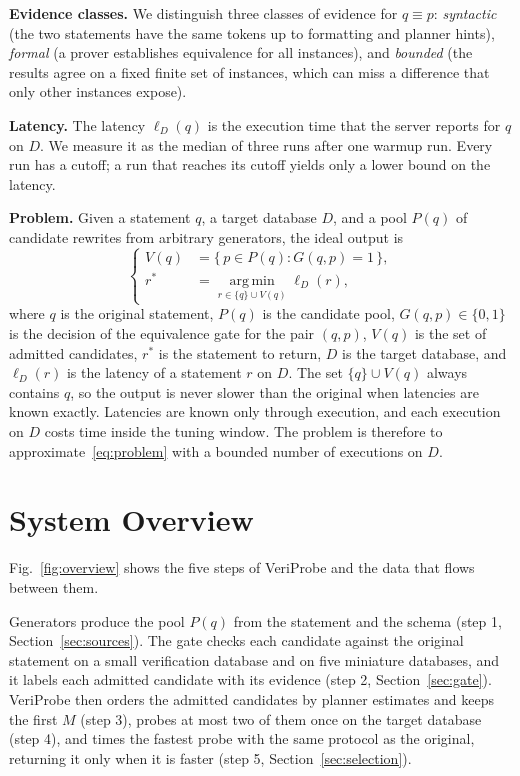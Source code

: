 \documentclass[conference]{IEEEtran}
\newcommand{\sys}{VeriProbe}
\begin{document}
\textbf{Evidence classes.}
We distinguish three classes of evidence for $q \equiv p$: \emph{syntactic} (the two statements have the same tokens up to formatting and planner hints), \emph{formal} (a prover establishes equivalence for all instances), and \emph{bounded} (the results agree on a fixed finite set of instances, which can miss a difference that only other instances expose).

\textbf{Latency.}
The latency $\ell_{D}(q)$ is the execution time that the server reports for $q$ on $D$.
We measure it as the median of three runs after one warmup run.
Every run has a cutoff; a run that reaches its cutoff yields only a lower bound on the latency.

\textbf{Problem.}
Given a statement $q$, a target database $D$, and a pool $P(q)$ of candidate rewrites from arbitrary generators, the ideal output is
\begin{equation}
\left\{
\begin{aligned}
V(q) &= \{\, p \in P(q) : G(q,p) = 1 \,\},\\
r^{\ast} &= \operatorname*{arg\,min}_{r \in \{q\} \cup V(q)} \ell_{D}(r),
\end{aligned}
\right.
\label{eq:problem}
\end{equation}
where $q$ is the original statement, $P(q)$ is the candidate pool, $G(q,p) \in \{0,1\}$ is the decision of the equivalence gate for the pair $(q,p)$, $V(q)$ is the set of admitted candidates, $r^{\ast}$ is the statement to return, $D$ is the target database, and $\ell_{D}(r)$ is the latency of a statement $r$ on $D$.
The set $\{q\} \cup V(q)$ always contains $q$, so the output is never slower than the original when latencies are known exactly.
Latencies are known only through execution, and each execution on $D$ costs time inside the tuning window.
The problem is therefore to approximate~\eqref{eq:problem} with a bounded number of executions on $D$.

\section{System Overview}
\label{sec:overview}

Fig.~\ref{fig:overview} shows the five steps of \sys{} and the data that flows between them.

Generators produce the pool $P(q)$ from the statement and the schema (step 1, Section~\ref{sec:sources}).
The gate checks each candidate against the original statement on a small verification database and on five miniature databases, and it labels each admitted candidate with its evidence (step 2, Section~\ref{sec:gate}).
\sys{} then orders the admitted candidates by planner estimates and keeps the first $M$ (step 3), probes at most two of them once on the target database (step 4), and times the fastest probe with the same protocol as the original, returning it only when it is faster (step 5, Section~\ref{sec:selection}).
\end{document}
